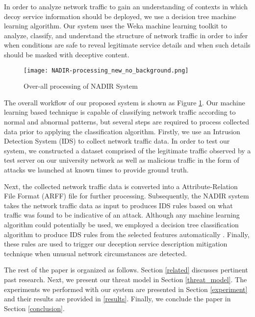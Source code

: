 In order to analyze network traffic to gain an understanding of contexts in which decoy service information should be deployed, we use a decision tree machine learning algorithm. Our system uses the Weka
machine learning toolkit \cite{misc:weka} to analyze, classify, and understand the structure of network traffic in order to infer when conditions are safe to reveal legitimate service details and when such
details should be masked with deceptive content.


\begin{figure}[h!]
	\texttt{[image: NADIR-processing\_new\_no\_background.png]}
	\caption{Over-all processing of NADIR System}
	\label{fig:overall}
\end{figure}

The overall workflow of our proposed system is shown as Figure \ref{fig:overall}. Our machine learning based technique is capable of classifying network traffic according to normal and abnormal patterns,
but several steps are required to process collected data prior to applying the classification algorithm. Firstly, we use an Intrusion Detection System (IDS) to collect network traffic data. In order to test
our system, we constructed a dataset comprised of the legitimate traffic observed by a test server on our university network as well as malicious traffic in the form of attacks we launched at known times to
provide ground truth.

Next, the collected network traffic data is converted into a Attribute-Relation File Format (ARFF) file for further processing. Subsequently, the NADIR system takes the network traffic data as input to
produces IDS rules based on what traffic was found to be indicative of an attack. Although any machine learning algorithm could potentially be used, we employed a decision tree classification algorithm to
produce IDS rules from the selected features automatically \cite{NetData2ARFF}. Finally, these rules are used to trigger our deception service description mitigation technique when unusual network
circumstances are detected.

The rest of the paper is organized as follows. Section \ref{related} discusses pertinent past research. Next, we present our threat model in Section \ref{threat_model}. The experiments we performed with our
system are presented in Section \ref{experiment} and their results are provided in \ref{results}. Finally, we conclude the paper in Section \ref{conclusion}.


